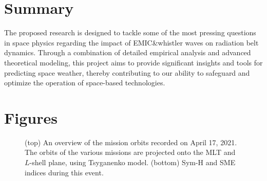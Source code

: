 \documentclass[
  letterpaper,
  DIV=11,
  numbers=noendperiod]{scrartcl}
\begin{document}
\section{Summary}\label{summary}

The proposed research is designed to tackle some of the most pressing questions in space physics regarding the impact of EMIC\&whistler waves on radiation belt dynamics. Through a combination of detailed empirical analysis and advanced theoretical modeling, this project aims to provide significant insights and tools for predicting space weather, thereby contributing to our ability to safeguard and optimize the operation of space-based technologies.

\section{Figures}\label{figures}

\begin{figure}


\caption{\label{fig-1}(top) An overview of the mission orbits recorded on April 17, 2021. The orbits of the various missions are projected onto the MLT and \(L\)-shell plane, using Tsyganenko model. (bottom) Sym-H and SME indices during this event.}

\end{figure}%
\end{document}
